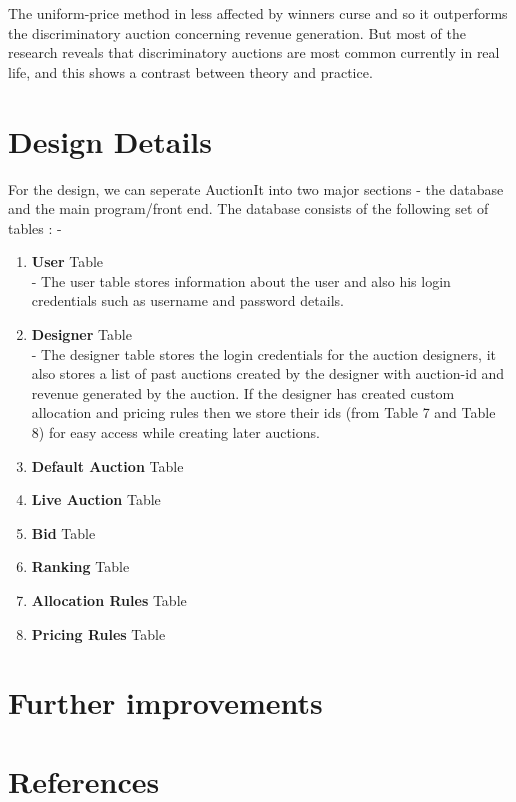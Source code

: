 \documentclass[a4paper]{article}
\begin{document}
The uniform-price method in less affected by winners curse and so it outperforms the discriminatory auction concerning revenue generation. But most of the research reveals that discriminatory auctions are most common currently in real life, and this shows a contrast between theory and practice.
\section*{Design Details}
For the design, we can seperate AuctionIt into two major sections -  the database and the main program/front end. The database consists of the following set of tables : - \\
\begin{enumerate}
    \item \textbf{User} Table\\
     - The user table stores information about the user and also his login credentials such as username and password details.
    \item \textbf{Designer} Table\\
    - The designer table stores the login credentials for the auction designers, it also stores a list of past auctions created by the designer with auction-id and revenue generated by the auction. If the designer has created custom allocation and pricing rules then we store their ids (from Table 7 and Table 8) for easy access while creating later auctions.
    \item \textbf{Default Auction} Table
    \item \textbf{Live Auction} Table
    \item \textbf{Bid} Table
    \item \textbf{Ranking} Table
    \item \textbf{Allocation Rules} Table
    \item \textbf{Pricing Rules} Table
\end{enumerate}
\section*{Further improvements}

\section*{References}
\end{document}
